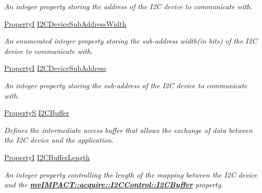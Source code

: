 \begin{DoxyCompactItemize}
\begin{DoxyCompactList}\small\item\em An integer property storing the address of the I2\+C device to communicate with. \end{DoxyCompactList}\item 
\hyperlink{group___common_interface_ga12d5e434238ca242a1ba4c6c3ea45780}{Property\+I} \hyperlink{classmv_i_m_p_a_c_t_1_1acquire_1_1_i2_c_control_a7e555a00afae7ba4008c20ef23586cd3}{I2\+C\+Device\+Sub\+Address\+Width}
\begin{DoxyCompactList}\small\item\em An enumerated integer property storing the sub-\/address width(in bits) of the I2\+C device to communicate with. \end{DoxyCompactList}\item 
\hyperlink{group___common_interface_ga12d5e434238ca242a1ba4c6c3ea45780}{Property\+I} \hyperlink{classmv_i_m_p_a_c_t_1_1acquire_1_1_i2_c_control_a9a319eb3849d69e8e19bbe606934eedf}{I2\+C\+Device\+Sub\+Address}
\begin{DoxyCompactList}\small\item\em An integer property storing the sub-\/address of the I2\+C device to communicate with. \end{DoxyCompactList}\item 
\hyperlink{classmv_i_m_p_a_c_t_1_1acquire_1_1_property_s}{Property\+S} \hyperlink{classmv_i_m_p_a_c_t_1_1acquire_1_1_i2_c_control_ab9693f8fbf9f3e22af775d7756d27a6c}{I2\+C\+Buffer}
\begin{DoxyCompactList}\small\item\em Defines the intermediate access buffer that allows the exchange of data between the I2\+C device and the application. \end{DoxyCompactList}\item 
\hypertarget{classmv_i_m_p_a_c_t_1_1acquire_1_1_i2_c_control_aa7b76f5aa0deae04e8ba5b2f74bff98a}{\hyperlink{group___common_interface_ga12d5e434238ca242a1ba4c6c3ea45780}{Property\+I} \hyperlink{classmv_i_m_p_a_c_t_1_1acquire_1_1_i2_c_control_aa7b76f5aa0deae04e8ba5b2f74bff98a}{I2\+C\+Buffer\+Length}}\label{classmv_i_m_p_a_c_t_1_1acquire_1_1_i2_c_control_aa7b76f5aa0deae04e8ba5b2f74bff98a}

\begin{DoxyCompactList}\small\item\em An integer property controlling the length of the mapping between the I2\+C device and the {\bfseries \hyperlink{classmv_i_m_p_a_c_t_1_1acquire_1_1_i2_c_control_ab9693f8fbf9f3e22af775d7756d27a6c}{mv\+I\+M\+P\+A\+C\+T\+::acquire\+::\+I2\+C\+Control\+::\+I2\+C\+Buffer}} property. \end{DoxyCompactList}\end{DoxyCompactItemize}
